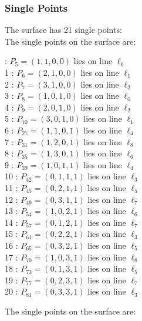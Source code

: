 \documentclass{article}
\begin{document}
{\subsubsection*{Single Points}
The surface has 21 single points:\\
The single points on the surface are:\\
\begin{multicols}{2}
 : $P_{5}=( 1, 1, 0, 0 )$ lies on line $\ell_{0}$\\
1 : $P_{6}=( 2, 1, 0, 0 )$ lies on line $\ell_{1}$\\
2 : $P_{7}=( 3, 1, 0, 0 )$ lies on line $\ell_{2}$\\
3 : $P_{8}=( 1, 0, 1, 0 )$ lies on line $\ell_{0}$\\
4 : $P_{9}=( 2, 0, 1, 0 )$ lies on line $\ell_{2}$\\
5 : $P_{10}=( 3, 0, 1, 0 )$ lies on line $\ell_{1}$\\
6 : $P_{27}=( 1, 1, 0, 1 )$ lies on line $\ell_{4}$\\
7 : $P_{31}=( 1, 2, 0, 1 )$ lies on line $\ell_{8}$\\
8 : $P_{35}=( 1, 3, 0, 1 )$ lies on line $\ell_{6}$\\
9 : $P_{39}=( 1, 0, 1, 1 )$ lies on line $\ell_{4}$\\
10 : $P_{42}=( 0, 1, 1, 1 )$ lies on line $\ell_{3}$\\
11 : $P_{45}=( 0, 2, 1, 1 )$ lies on line $\ell_{5}$\\
12 : $P_{49}=( 0, 3, 1, 1 )$ lies on line $\ell_{7}$\\
13 : $P_{54}=( 1, 0, 2, 1 )$ lies on line $\ell_{6}$\\
14 : $P_{57}=( 0, 1, 2, 1 )$ lies on line $\ell_{7}$\\
15 : $P_{61}=( 0, 2, 2, 1 )$ lies on line $\ell_{3}$\\
16 : $P_{65}=( 0, 3, 2, 1 )$ lies on line $\ell_{5}$\\
17 : $P_{70}=( 1, 0, 3, 1 )$ lies on line $\ell_{8}$\\
18 : $P_{73}=( 0, 1, 3, 1 )$ lies on line $\ell_{5}$\\
19 : $P_{77}=( 0, 2, 3, 1 )$ lies on line $\ell_{7}$\\
20 : $P_{81}=( 0, 3, 3, 1 )$ lies on line $\ell_{3}$\\
\end{multicols}
The single points on the surface are:\\
}
\end{document}
